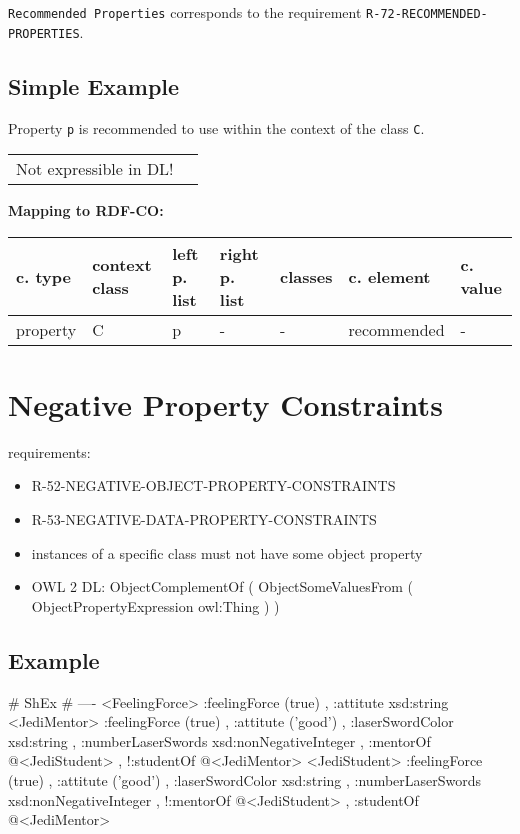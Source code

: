 \documentclass{llncs}
\newcommand{\ms}[1]{\texttt{#1}}
\newenvironment{gcotable}{
  \scriptsize
  \sffamily
  \vspace{0cm}
	\begin{center}
	\textbf{\vspace{0.4cm}Mapping to RDF-CO:} \\
  \begin{tabular}{l|l|l|l|l|l|l}
	\hline
  \textbf{c. type} & \textbf{context class} & \textbf{left p. list} & \textbf{right p. list} & \textbf{classes} & \textbf{c. element} & \textbf{c. value} \\
  \hline

}{
  \hline
  \end{tabular}
	\end{center}
}
\newenvironment{DL}{
  \vspace{0cm}
	\begin{center}
  \begin{tabular}{r l}

}{
  \end{tabular}
	\end{center}
}
\begin{document}
\ms{Recommended Properties} corresponds to the requirement \ms{R-72-RECOMMENDED-PROPERTIES}.

\subsection{Simple Example}

Property \ms{p} is recommended to use within the context of the class \ms{C}.

\begin{DL}
Not expressible in DL!
\end{DL}

\begin{gcotable}
property & C & p & - & - & recommended & - \\
\end{gcotable}

\section{Negative Property Constraints}

requirements:

\begin{itemize}
	\item R-52-NEGATIVE-OBJECT-PROPERTY-CONSTRAINTS
	\item R-53-NEGATIVE-DATA-PROPERTY-CONSTRAINTS
\end{itemize}

\begin{itemize}
	\item instances of a specific class must not have some object property
  \item OWL 2 DL: ObjectComplementOf ( ObjectSomeValuesFrom ( ObjectPropertyExpression owl:Thing ) )
\end{itemize}

\subsection{Example}

\begin{ex}
# ShEx
# ----
<FeelingForce> {
    :feelingForce (true) ,
    :attitute xsd:string }
<JediMentor> {
    :feelingForce (true) ,
    :attitute ('good') ,
    :laserSwordColor xsd:string ,
    :numberLaserSwords xsd:nonNegativeInteger ,
    :mentorOf @<JediStudent> ,
   !:studentOf @<JediMentor> }
<JediStudent> {
    :feelingForce (true) ,
    :attitute ('good') ,
    :laserSwordColor xsd:string ,
    :numberLaserSwords xsd:nonNegativeInteger ,
   !:mentorOf @<JediStudent> ,
    :studentOf @<JediMentor> }
\end{ex}
\end{document}
